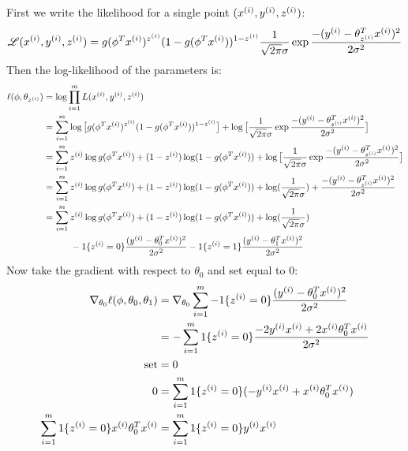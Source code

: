 \documentclass[11pt]{article}
\begin{document}
First we write the likelihood for a single point $(x^{(i)}, y^{(i)}, z^{(i)})$:\\
\begin{align*}
    \mathscr{L}(x^{(i)},y^{(i)},z^{(i)}) = g(\phi^T x^{(i)})^{z^{(i)}} (1 - g(\phi^T x^{(i)}))^{1 - z^{(i)}} \frac{1}{\sqrt{2 \pi} \sigma} \exp{\frac{-(y^{(i)}- \theta_{z^{(i)}}^T x^{(i)})^2}{2 \sigma^2}} \\ 
\end{align*}
Then the log-likelihood of the parameters is:
\begin{align*}
    \ell(\phi,\theta_{z^{(i)}}) &= \log \prod_{i=1}^m L(x^{(i)},y^{(i)},z^{(i)}) \\
                              &= \sum_{i=1}^m \log\big[g(\phi^T x^{(i)})^{z^{(i)}} (1 - g(\phi^T x^{(i)}))^{1 - z^{(i)}}\big] + \log\big[\frac{1}{\sqrt{2 \pi} \sigma} \exp{\frac{-(y^{(i)}- \theta_{z^{(i)}}^T x^{(i)})^2}{2 \sigma^2}}\big] \\
                              &= \sum_{i=1}^m z^{(i)} \log g(\phi^T x^{(i)}) + (1 - z^{(i)}) \log (1 - g(\phi^T x^{(i)})) + \log\big[\frac{1}{\sqrt{2 \pi} \sigma} \exp{\frac{-(y^{(i)}- \theta_{z^{(i)}}^T x^{(i)})^2}{2 \sigma^2}}\big] \\
                              &= \sum_{i=1}^m z^{(i)} \log g(\phi^T x^{(i)}) + (1 - z^{(i)}) \log (1 - g(\phi^T x^{(i)})) + \log (\frac{1}{\sqrt{2 \pi} \sigma}) +  \frac{-(y^{(i)} - \theta_{z^{(i)}}^T x^{(i)})^2}{2 \sigma^2} \\
                              &= \sum_{i=1}^m z^{(i)} \log g(\phi^T x^{(i)}) + (1 - z^{(i)}) \log (1 - g(\phi^T x^{(i)})) + \log (\frac{1}{\sqrt{2 \pi} \sigma}) \\
                              &\quad\quad\quad - 1\{z^{(i)} = 0\} \frac{(y^{(i)} - \theta_0^T x^{(i)})^2}{2 \sigma^2} - 1\{z^{(i)} = 1\} \frac{(y^{(i)} - \theta_1^T x^{(i)})^2}{2 \sigma^2} \\
\end{align*}
Now take the gradient with respect to $\theta_0$ and set equal to $0$:
\begin{align*}
    \nabla_{\theta_0} \ell(\phi,\theta_0,\theta_1) &= \nabla_{\theta_0} \sum_{i=1}^m -1\{z^{(i)} = 0\} \frac{(y^{(i)} - \theta_0^T x^{(i)})^2}{2 \sigma^2} \\ 
                                                   &= - \sum_{i=1}^m 1\{z^{(i)} = 0\} \frac{-2 y^{(i)} x^{(i)} + 2 x^{(i)} \theta_0^T x^{(i)}}{2 \sigma^2} \\
                                        \text{set} &= 0 \\
                                                 0 &= \sum_{i=1}^m 1\{z^{(i)} = 0\} (-y^{(i)} x^{(i)} + x^{(i)} \theta_0^T x^{(i)}) \\
    \sum_{i=1}^m 1\{z^{(i)} = 0\} x^{(i)} \theta_0^T x^{(i)} &= \sum_{i=1}^m 1\{z^{(i)} = 0\} y^{(i)} x^{(i)} \\
\end{align*}
\end{document}
